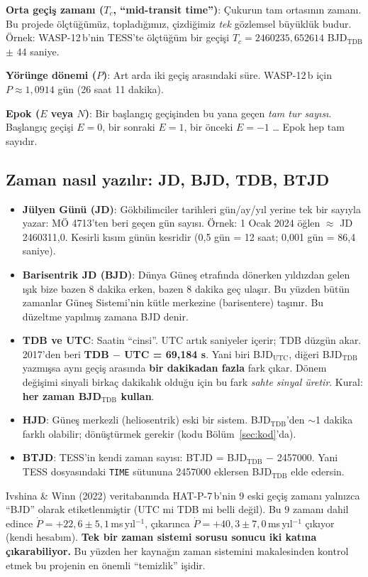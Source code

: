 \documentclass[11pt,a4paper]{article}
\newcommand{\msyil}{\,ms\,yıl$^{-1}$}
\begin{document}
\textbf{Orta geçiş zamanı ($T_c$, “mid-transit time”)}: Çukurun tam ortasının zamanı. Bu projede ölçtüğümüz,
topladığımız, çizdiğimiz \emph{tek} gözlemsel büyüklük budur. Örnek: WASP-12\,b'nin TESS'te ölçtüğüm bir geçişi
$T_c = 2460235{,}652614$ BJD$_\mathrm{TDB}$ $\pm$ 44 saniye.

\textbf{Yörünge dönemi ($P$)}: Art arda iki geçiş arasındaki süre. WASP-12\,b için $P \approx 1{,}0914$ gün
(26 saat 11 dakika).

\textbf{Epok ($E$ veya $N$)}: Bir başlangıç geçişinden bu yana geçen \emph{tam tur sayısı}. Başlangıç geçişi
$E=0$, bir sonraki $E=1$, bir önceki $E=-1$ \dots{} Epok hep tam sayıdır.

\subsection{Zaman nasıl yazılır: JD, BJD, TDB, BTJD}
\begin{itemize}[leftmargin=*]
\item \textbf{Jülyen Günü (JD)}: Gökbilimciler tarihleri gün/ay/yıl yerine tek bir sayıyla yazar: MÖ 4713'ten beri
geçen gün sayısı. Örnek: 1 Ocak 2024 öğlen $\approx$ JD 2460311,0. Kesirli kısım günün kesridir
(0,5 gün = 12 saat; 0,001 gün = 86,4 saniye).
\item \textbf{Barisentrik JD (BJD)}: Dünya Güneş etrafında dönerken yıldızdan gelen ışık bize bazen 8 dakika
erken, bazen 8 dakika geç ulaşır. Bu yüzden bütün zamanlar Güneş Sistemi'nin kütle merkezine (barisentere)
taşınır. Bu düzeltme yapılmış zamana BJD denir.
\item \textbf{TDB ve UTC}: Saatin “cinsi”. UTC artık saniyeler içerir; TDB düzgün akar.
2017'den beri \textbf{TDB $-$ UTC = 69,184 s}. Yani biri BJD$_\mathrm{UTC}$, diğeri BJD$_\mathrm{TDB}$ yazmışsa
aynı geçiş arasında \textbf{bir dakikadan fazla} fark çıkar. Dönem değişimi sinyali birkaç dakikalık olduğu için
bu fark \emph{sahte sinyal üretir}. Kural: \textbf{her zaman BJD$_\mathrm{TDB}$ kullan}.
\item \textbf{HJD}: Güneş merkezli (heliosentrik) eski bir sistem. BJD$_\mathrm{TDB}$'den $\sim$1 dakika farklı
olabilir; dönüştürmek gerekir (kodu Bölüm~\ref{sec:kod}'da).
\item \textbf{BTJD}: TESS'in kendi zaman sayısı: BTJD = BJD$_\mathrm{TDB}$ $-$ 2457000. Yani TESS dosyasındaki
\texttt{TIME} sütununa 2457000 eklersen BJD$_\mathrm{TDB}$ elde edersin.
\end{itemize}

\begin{dikkat}
Ivshina \& Winn (2022) veritabanında HAT-P-7\,b'nin 9 eski geçiş zamanı yalnızca “BJD” olarak etiketlenmiştir
(UTC mi TDB mi belli değil). Bu 9 zamanı dahil edince $\dot P = +22{,}6 \pm 5{,}1$\msyil, çıkarınca
$\dot P = +40{,}3 \pm 7{,}0$\msyil{} çıkıyor (kendi hesabım). \textbf{Tek bir zaman sistemi sorusu sonucu iki katına
çıkarabiliyor.} Bu yüzden her kaynağın zaman sistemini makalesinden kontrol etmek bu projenin en önemli “temizlik”
işidir.
\end{dikkat}
\end{document}

